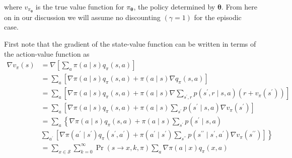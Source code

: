 \documentclass{homework}
\begin{document}
where $v_{\pi_{\boldsymbol{\theta}}}$ is the true value function for $\pi_{\boldsymbol{\theta}}$, the policy determined by $\boldsymbol{\theta}$. From here on in our discussion we will assume no discounting $(\gamma=1)$ for the episodic case.

First note that the gradient of the state-value function can be written in terms of the action-value function as
$$
\begin{aligned}
\nabla v_{\pi}(s) & =\nabla\left[\sum_{a} \pi(a \mid s) q_{\pi}(s, a)\right] \\
& =\sum_{a}\left[\nabla \pi(a \mid s) q_{\pi}(s, a)+\pi(a \mid s) \nabla q_{\pi}(s, a)\right]  \\
& =\sum_{a}\left[\nabla \pi(a \mid s) q_{\pi}(s, a)+\pi(a \mid s) \nabla \sum_{s^{\prime}, r} p\left(s^{\prime}, r \mid s, a\right)\left(r+v_{\pi}\left(s^{\prime}\right)\right)\right] \\
& =\sum_{a}\left[\nabla \pi(a \mid s) q_{\pi}(s, a)+\pi(a \mid s) \sum_{s^{\prime}} p\left(s^{\prime} \mid s, a\right) \nabla v_{\pi}\left(s^{\prime}\right)\right] \\
& =\sum_{a}\left\{\nabla \pi(a \mid s) q_{\pi}(s, a)+\pi(a \mid s) \sum_{s^{\prime}} p\left(s^{\prime} \mid s, a\right)\right. \\
& \left.\sum_{a^{\prime}}\left[\nabla \pi\left(a^{\prime} \mid s^{\prime}\right) q_{\pi}\left(s^{\prime}, a^{\prime}\right)+\pi\left(a^{\prime} \mid s^{\prime}\right) \sum_{s^{\prime \prime}} p\left(s^{\prime \prime} \mid s^{\prime}, a^{\prime}\right) \nabla v_{\pi}\left(s^{\prime \prime}\right)\right]\right\} \\
& =\sum_{x \in \mathcal{S}} \sum_{k=0}^{\infty} \operatorname{Pr}(s \rightarrow x, k, \pi) \sum_{a} \nabla \pi(a \mid x) q_{\pi}(x, a)
\end{aligned}
$$
\end{document}
